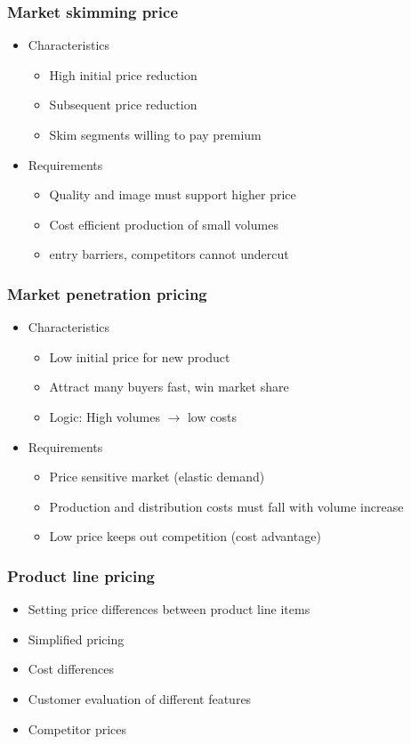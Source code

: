 \documentclass[a4paper,titlepage] {scrartcl}
\begin{document}
\subsubsection{Market skimming price}
\begin{itemize}
	\item Characteristics
	\begin{itemize}
		\item High initial price reduction
		\item Subsequent price reduction
		\item Skim segments willing to pay premium
	\end{itemize}
	\item Requirements
	\begin{itemize}
		\item Quality and image must support higher price
		\item Cost efficient production of small volumes
		\item entry barriers, competitors cannot undercut
	\end{itemize}
\end{itemize}

\subsubsection{Market penetration pricing}
\begin{itemize}
	\item Characteristics
	\begin{itemize}
		\item Low initial price for new product
		\item Attract many buyers fast, win market share
		\item Logic: High volumes $\rightarrow$ low costs
	\end{itemize}
	\item Requirements
	\begin{itemize}
		\item Price sensitive market (elastic demand)
		\item Production and distribution costs must fall with volume increase
		\item Low price keeps out competition (cost advantage)
	\end{itemize}
\end{itemize}

\subsubsection{Product line pricing}
\begin{itemize}
	\item Setting price differences between product line items
	\item Simplified pricing
	\item Cost differences
	\item Customer evaluation of different features
	\item Competitor prices
\end{itemize}
\end{document}
